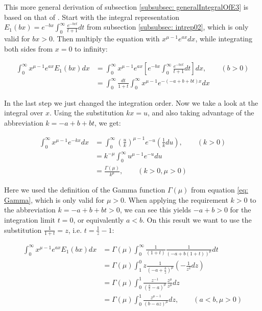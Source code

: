 \documentclass[bibliography=totocnumbered]{scrartcl}
\newcommand{\assume}[1][\text{MISSING PARAMETER}]{,\qquad\left(#1\right)}
\begin{document}
			This more general derivation of subsection \ref{subsubsec: generalIntegralOfE3} is based on that of \autocite[73\psq]{schloemilch}. Start with the integral representation $E_1\left(bx\right)=e^{-bx}\int_{0}^{\infty}\frac{e^{-bxt}}{t+1}dt$ from subsection \ref{subsubsec: intrep02}, which is only valid for $bx>0$. Then multiply the equation with $x^{\mu-1}e^{ax}dx$, while integrating both sides from $x=0$ to infinity:
			
			\begin{align}
			\int_{0}^{\infty}x^{\mu-1}e^{ax}E_1\left(bx\right)dx&=\int_{0}^{\infty}x^{\mu-1}e^{ax}\left[e^{-bx}\int_{0}^{\infty}\frac{e^{-bxt}}{t+1}dt\right]dx\assume[b>0]\\
			&=\int_{0}^{\infty}\frac{dt}{1+t}\int_{0}^{\infty}x^{\mu-1}e^{-\left(-a+b+bt\right)x}dx
			\end{align}
			
			In the last step we just changed the integration order. Now we take a look at the integral over $x$. Using the substitution $kx=u$, and also taking advantage of the abbreviation $k=-a+b+bt$, we get:
			
			\begin{align}
			\int_{0}^{\infty}x^{\mu-1}e^{-kx}dx&=\int_{0}^{\infty}\left(\frac{u}{k}\right)^{\mu-1}e^{-u}\left(\frac{1}{k}du\right)\assume[k>0]\\
			&=k^{-\mu}\int_{0}^{\infty}u^{\mu-1}e^{-u}du\\
			&=\frac{\Gamma\left(\mu\right)}{k^{\mu}}\assume[k>0, \mu>0]
			\end{align}
			
			Here we used the definition of the Gamma function $\Gamma\left(\mu\right)$ from equation \eqref{eq: Gamma}, which is only valid for $\mu>0$. When applying the requirement $k>0$ to the abbreviation $k=-a+b+bt>0$, we can see this yields $-a+b>0$ for the integration limit $t=0$, or equivalently $a<b$. On this result we want to use the substitution $\frac{1}{1+t}=z$, i.e. $t=\frac{1}{z}-1$:
			
			\begin{align}
			\int_{0}^{\infty}x^{\mu-1}e^{ax}E_1\left(bx\right)dx&=\Gamma\left(\mu\right)\int_{0}^{\infty}\frac{1}{\left(1+t\right)}\frac{1}{\left(-a+b\left(1+t\right)\right)^\mu}dt\\
			&=\Gamma\left(\mu\right)\int_{1}^{0}z\frac{1}{\left(-a+\frac{b}{z}\right)^{\mu}}\left(-\frac{1}{z^2}dz\right)\\
			&=\Gamma\left(\mu\right)\int_{0}^{1}\frac{z^{-1}}{\left(\frac{b}{z}-a\right)^{\mu}}\frac{z^{\mu}}{z^{\mu}}dz\\
			&=\Gamma\left(\mu\right)\int_{0}^{1}\frac{z^{\mu-1}}{\left(b-az\right)^{\mu}}dz\assume[a<b, \mu>0]
			\end{align}
			
\end{document}
